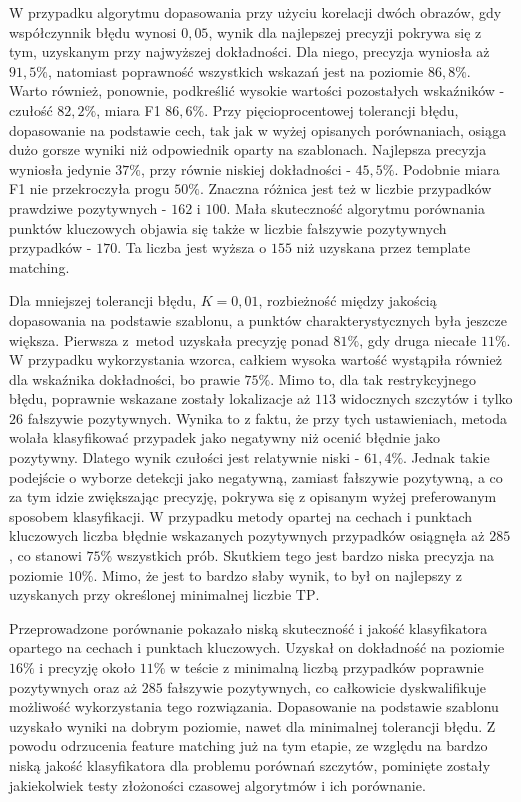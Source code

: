  

 W przypadku algorytmu dopasowania przy użyciu korelacji dwóch obrazów, gdy współczynnik błędu wynosi $0,05$, wynik dla najlepszej precyzji pokrywa się z tym, uzyskanym przy najwyższej dokładności. Dla niego, precyzja wyniosła aż $91,5\%$, natomiast poprawność wszystkich wskazań jest na poziomie $86,8\%$. Warto również, ponownie, podkreślić wysokie wartości pozostałych wskaźników - czułość $82,2\%$, miara F1 $86,6\%$. Przy pięcioprocentowej tolerancji błędu, dopasowanie na podstawie cech, tak jak w wyżej opisanych porównaniach, osiąga dużo gorsze wyniki niż odpowiednik oparty na szablonach. Najlepsza precyzja wyniosła jedynie $37\%$, przy równie niskiej dokładności - $45,5\%$. Podobnie  miara F1 nie przekroczyła progu $50\%$. Znaczna różnica jest też w liczbie przypadków prawdziwe pozytywnych - $162$ i $100$. Mała skuteczność algorytmu porównania punktów kluczowych objawia się także w liczbie fałszywie pozytywnych przypadków - $170$. Ta liczba jest wyższa o $155$ niż uzyskana przez template matching.

 Dla mniejszej tolerancji błędu, $K=0,01$, rozbieżność między jakością dopasowania na podstawie szablonu, a punktów charakterystycznych była jeszcze większa. Pierwsza z~metod uzyskała precyzję ponad $81\%$, gdy druga niecałe $11\%$. W przypadku wykorzystania wzorca, całkiem wysoka wartość wystąpiła również dla wskaźnika dokładności, bo prawie $75\%$. Mimo to, dla tak restrykcyjnego błędu, poprawnie wskazane zostały lokalizacje aż $113$ widocznych szczytów i tylko $26$ fałszywie pozytywnych. Wynika to z faktu, że przy tych ustawieniach, metoda wolała klasyfikować przypadek jako negatywny niż ocenić błędnie jako pozytywny. Dlatego wynik czułości jest relatywnie niski - $61,4\%$. Jednak takie podejście o wyborze detekcji jako negatywną, zamiast fałszywie pozytywną, a co za tym idzie zwiększając precyzję, pokrywa się z opisanym wyżej preferowanym sposobem klasyfikacji. W przypadku metody opartej na cechach i punktach kluczowych liczba błędnie wskazanych pozytywnych przypadków osiągnęła aż $285$, co stanowi $75\%$ wszystkich prób. Skutkiem tego jest bardzo niska precyzja na poziomie $10\%$. Mimo, że jest to bardzo słaby wynik, to był on najlepszy z uzyskanych przy określonej minimalnej liczbie $\textrm{TP}$. 




Przeprowadzone porównanie pokazało niską skuteczność i jakość klasyfikatora opartego na cechach i punktach kluczowych. Uzyskał on dokładność na poziomie $16\%$ i precyzję około $11\%$ w teście z minimalną liczbą przypadków poprawnie pozytywnych oraz aż $285$ fałszywie pozytywnych, co całkowicie dyskwalifikuje możliwość wykorzystania tego rozwiązania. Dopasowanie na podstawie szablonu uzyskało wyniki na dobrym poziomie, nawet dla minimalnej tolerancji błędu. Z powodu odrzucenia feature matching już na tym etapie, ze względu na bardzo niską jakość klasyfikatora dla problemu porównań szczytów, pominięte zostały jakiekolwiek testy złożoności czasowej algorytmów i ich porównanie.


